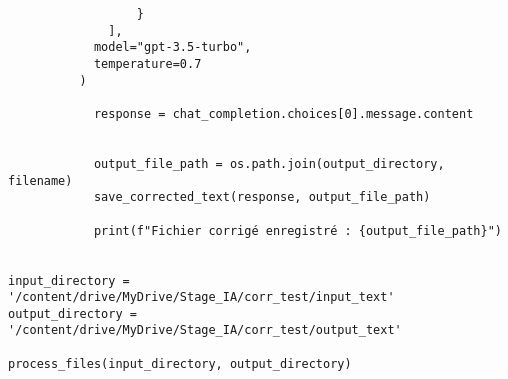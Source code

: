 \begin{verbatim}
                  }
              ],
            model="gpt-3.5-turbo",
            temperature=0.7
          )

            response = chat_completion.choices[0].message.content


            output_file_path = os.path.join(output_directory, filename)
            save_corrected_text(response, output_file_path)

            print(f"Fichier corrigé enregistré : {output_file_path}")


input_directory = '/content/drive/MyDrive/Stage_IA/corr_test/input_text'
output_directory = '/content/drive/MyDrive/Stage_IA/corr_test/output_text'

process_files(input_directory, output_directory)
\end{verbatim}